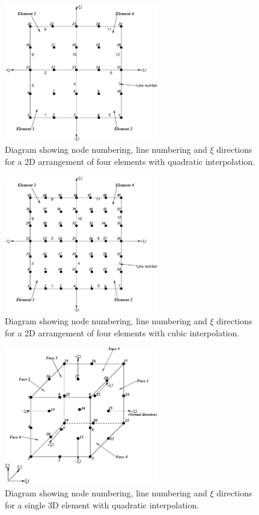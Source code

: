 \begin{figure}
\centering
      \includegraphics[width=0.6\textwidth]{figs/Modules/2D_quadratic.eps}
\caption{Diagram showing node numbering, line numbering and $\xi$ directions 
for a 2D arrangement of four elements with quadratic interpolation.}
\label{2D_quadratic}
\end{figure}

\begin{figure}
\centering
      \includegraphics[width=0.6\textwidth]{figs/Modules/2D_cubic.eps}
\caption{Diagram showing node numbering, line numbering and $\xi$ directions 
for a 2D arrangement of four elements with cubic interpolation.}
\label{2D_cubic}
\end{figure}

\begin{figure}
\centering
      \includegraphics[width=0.6\textwidth]{figs/Modules/cube.eps}
\caption{Diagram showing node numbering, line numbering and $\xi$ directions 
for a single 3D element with quadratic interpolation.}
\label{cube}
\end{figure}

